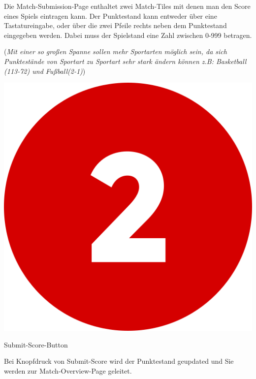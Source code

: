 Die Match-Submission-Page enthaltet zwei Match-Tiles mit denen man den Score eines Spiels eintragen kann.
Der Punktestand kann entweder über eine Tastatureingabe, oder über die zwei Pfeile rechts neben dem Punktestand eingegeben werden.
Dabei muss der Spielstand eine Zahl zwischen 0-999 betragen.

(\textit{Mit einer so großen Spanne sollen mehr Sportarten möglich sein, da sich Punktestände von Sportart zu Sportart sehr stark ändern können z.B: Basketball (113-72) und Fußball(2-1)})

\bigskip
\includegraphics[scale=0.05]{pics/user-guide/numbers/number-2.png} \begin{LARGE} Submit-Score-Button \end{LARGE}

Bei Knopfdruck von Submit-Score wird der Punktestand geupdated und Sie werden zur Match-Overview-Page geleitet.

